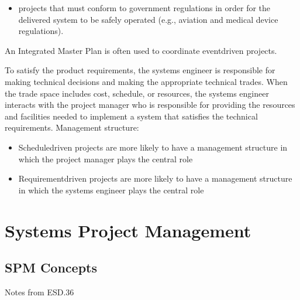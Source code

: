 \documentclass[letterpaper,10pt,english]{jupyterBook}
\begin{document}
\begin{itemize}
\begin{itemize}
\begin{itemize}
\item {} 
\sphinxAtStartPar
projects that must conform to government regulations in order for the delivered system to be safely operated (e.g.,
aviation and medical device regulations).

\end{itemize}

\end{itemize}

\end{itemize}

\sphinxAtStartPar
An Integrated Master Plan is often used to coordinate event\sphinxhyphen{}driven projects.

\sphinxAtStartPar
To satisfy the product requirements, the systems engineer is responsible for making technical decisions and making
the appropriate technical trades.
When the trade space includes cost, schedule, or resources, the systems engineer
interacts with the project manager who is responsible for providing the resources and facilities needed to implement
a system that satisfies the technical requirements.
Management structure:
\begin{itemize}
\item {} 
\sphinxAtStartPar
Schedule\sphinxhyphen{}driven projects are more likely to have a management structure in which the project manager plays the
central role

\item {} 
\sphinxAtStartPar
Requirement\sphinxhyphen{}driven projects are more likely to have a management structure in which the systems engineer plays the central role

\end{itemize}

\sphinxstepscope


\part{Systems Project Management}

\sphinxstepscope


\chapter{SPM Concepts}
\label{\detokenize{SPM/spm-concepts:spm-concepts}}\label{\detokenize{SPM/spm-concepts::doc}}
\sphinxAtStartPar
Notes from ESD.36
\end{document}
